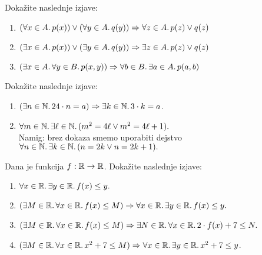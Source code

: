 \begin{vaja}
  Dokažite naslednje izjave:
  \begin{enumerate}
  \item $(\forall x \in A .\, p(x)) \lor (\forall y \in A .\, q(y)) \Rightarrow \forall z \in A .\, p(z) \lor q(z)$
  \item $(\exists x \in A .\, p(x)) \lor (\exists y \in A .\, q(y)) \Rightarrow \exists z \in A .\, p(z) \lor q(z)$
  \item $(\exists x \in A .\, \forall y \in B .\, p(x, y)) \Rightarrow \forall b \in B .\, \exists a \in A .\, p(a, b)$
  \end{enumerate}
\end{vaja}

\begin{vaja}
  Dokažite naslednje izjave:
  \begin{enumerate}
  \item $(\exists n \in \mathbb{N} .\, 24 \cdot n = a) \Rightarrow \exists k \in \mathbb{N} .\, 3 \cdot k = a$.
  \item $\forall m \in \mathbb{N} .\, \exists \ell \in \mathbb{N} .\, (m^2 = 4 \ell \lor m^2 = 4 \ell + 1).$\\
    Namig:  brez dokaza smemo uporabiti dejstvo
    $\forall n \in \mathbb{N} .\, \exists k \in \mathbb{N} .\, (n = 2 k \lor n = 2 k + 1).$
  \end{enumerate}
\end{vaja}

\begin{vaja}
  Dana je funkcija $f : \mathbb{R} \to \mathbb{R}$. Dokažite naslednje izjave:
  \begin{enumerate}
  \item  $\forall x \in \mathbb{R} .\, \exists y \in \mathbb{R} .\, f(x) \leq y.$
  \item$(\exists M \in \mathbb{R} .\, \forall x \in \mathbb{R} .\, f(x) \leq M) \Rightarrow \forall x \in \mathbb{R} .\, \exists y \in \mathbb{R} .\, f(x) \leq y.$
  \item $(\exists M \in \mathbb{R} .\, \forall x \in \mathbb{R} .\, f(x) \leq M) \Rightarrow \exists N \in \mathbb{R} .\, \forall x \in \mathbb{R} .\, 2 \cdot f(x) + 7 \leq N.$
  \item $(\exists M \in \mathbb{R} .\, \forall x \in \mathbb{R} .\, x^2 + 7 \leq M) \Rightarrow \forall x \in \mathbb{R} .\, \exists y \in \mathbb{R} .\, x^2 + 7 \leq y$.
  \end{enumerate}
\end{vaja}


